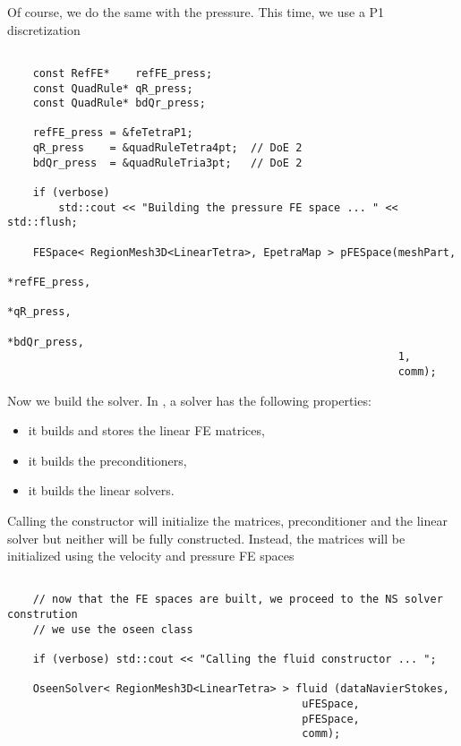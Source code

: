 Of course, we do the same with the pressure. This time, we use a P1 discretization

\begin{verbatim}

    const RefFE*    refFE_press;
    const QuadRule* qR_press;
    const QuadRule* bdQr_press;

    refFE_press = &feTetraP1;
    qR_press    = &quadRuleTetra4pt;  // DoE 2
    bdQr_press  = &quadRuleTria3pt;   // DoE 2

    if (verbose)
        std::cout << "Building the pressure FE space ... " << std::flush;

    FESpace< RegionMesh3D<LinearTetra>, EpetraMap > pFESpace(meshPart,
                                                             *refFE_press,
                                                             *qR_press,
                                                             *bdQr_press,
                                                             1,
                                                             comm);

\end{verbatim}

Now we build the solver. In \lifev,
a solver has the following properties:
\begin{itemize}
\item it builds and stores the linear FE matrices,
\item it builds the preconditioners,
\item it builds the linear solvers.
\end{itemize}

Calling the constructor will initialize the matrices, preconditioner and the linear solver
but neither will be fully constructed. Instead, the matrices will be initialized using the
velocity and pressure FE spaces

\begin{verbatim}

    // now that the FE spaces are built, we proceed to the NS solver constrution
    // we use the oseen class

    if (verbose) std::cout << "Calling the fluid constructor ... ";

    OseenSolver< RegionMesh3D<LinearTetra> > fluid (dataNavierStokes,
                                              uFESpace,
                                              pFESpace,
                                              comm);


\end{verbatim}

